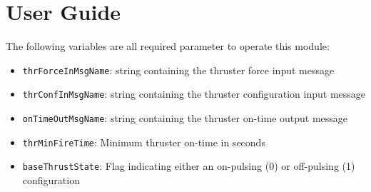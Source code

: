 
\section{User Guide}
The following variables are all required parameter to operate this module:
\begin{itemize}
	\item {\tt thrForceInMsgName}:  string containing the thruster force input message
	\item {\tt thrConfInMsgName}:  string containing the thruster configuration input message
	\item {\tt onTimeOutMsgName}:  string containing the thruster on-time output message
	\item {\tt thrMinFireTime}:  Minimum thruster on-time in seconds
	\item {\tt baseThrustState}:  Flag indicating either an on-pulsing (0) or off-pulsing (1) configuration
\end{itemize}
